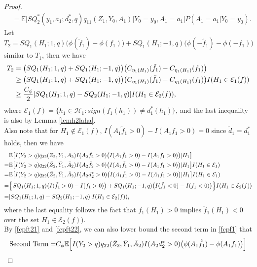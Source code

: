 \documentclass[10pt]{article}
\theoremstyle{remark} \newtheorem{rem}{Remark}
\begin{document}
\begin{proof}
\begin{align*}
        &= \mathbb{E}\big[SQ_2^*(\bar y_1,a_1;d_2^*,q)q_{11}(Z_1, Y_0, A_1)|Y_0= y_0, A_1= a_1\big]P(A_1=a_1|Y_0=y_0).
    \end{align*}
    Let $T_2 = SQ_1(H_1;1,q)\big(\phi(\tilde f_1)-\phi(f_1)\big) + SQ_1(H_1;-1,q)\big(\phi(-\tilde f_1)-\phi(-f_1)\big)$ similar to $T_1$, then we have
    \begin{align}
        T_2 &= \big(SQ_1(H_1;1,q)+SQ_1(H_1;-1,q)\big)\big(C_{\eta_1(H_1)}(\tilde f_1)-C_{\eta_1(H_1)}(f_1)\big) \notag\\
        &\geq \big(SQ_1(H_1;1,q)+SQ_1(H_1;-1,q)\big)\big(C_{\eta_1(H_1)}(\tilde f_1)-C_{\eta_1(H_1)}(f_1)\big)I(H_1\in\mathcal{E}_1(f)) \notag\\
        &\geq \frac{C_\phi}{2}|SQ_1(H_1;1,q)-SQ_2(H_1;-1,q)|I(H_1\in \mathcal{E}_2(f)), \label{fcpft21}
    \end{align}
    where $\mathcal{E}_1(f)=\{h_1\in \mathcal H_1:sign(f_1(h_1)) \neq d^*_1(h_1)\}$, and the last inequality is also by Lemma \ref{lemh2laha}.\\
    Also note that for $H_1 \notin \mathcal{E}_1(f)$, $I(A_1\tilde f_1>0)-I(A_1f_1>0)=0$ since $\tilde d_1 = d_1^*$ holds, then we have
    \begin{align}
        & \mathbb{E} \big[I(Y_2>q)q_{22}(\bar Z_{2}, \bar Y_{1}, \bar A_{2})I(A_2\tilde f_2>0)\big(I(A_1\tilde f_1>0)-I(A_1f_1>0)\big)|H_1\big] \notag\\
        =& \mathbb{E} \big[I(Y_2>q)q_{22}(\bar Z_{2}, \bar Y_{1}, \bar A_{2})I(A_2 \tilde f_2>0)\big(I(A_1\tilde f_1>0)-I(A_1f_1>0)\big)|H_1\big] I(H_1\in \mathcal{E}_1) \notag\\
        =& \mathbb{E} \big[I(Y_2>q)q_{22}(\bar Z_{2}, \bar Y_{1}, \bar A_{2})I(A_2 d_2^*>0)\big(I(A_1\tilde f_1>0)-I(A_1f_1>0)\big)|H_1\big] I(H_1\in \mathcal{E}_1) \notag\\
        =& \Big\{SQ_1(H_1;1,q)\big(I(\tilde f_1>0)-I(f_1>0)\big)+SQ_1(H_1;-1,q)\big(I(\tilde f_1<0)-I(f_1<0)\big)\Big\}I(H_1\in \mathcal{E}_2(f)) \notag\\
        =& |SQ_1(H_1;1,q)-SQ_2(H_1;-1,q)|I(H_1\in \mathcal{E}_2(f)), \label{fcpft22}
    \end{align}
    where the last equality follows the fact that $f_1(H_1)>0$ implies $\tilde f_1(H_1)<0$ over the set $H_1\in \mathcal{E}_2(f))$.\\
    By \eqref{fcpft21} and \eqref{fcpft22}, we can also lower bound the second term in \eqref{fcpf1} that
    \begin{align}
        \text{Second Term} =& C_\phi\mathbb{E} \Big[I(Y_2>q)q_{22}(\bar Z_{2}, \bar Y_{1}, \bar A_{2})I(A_2d_2^*>0)\big(\phi(A_1\tilde f_1)-\phi(A_1f_1)\big)\Big] \notag\\

\end{align}
\end{proof}
\end{document}
